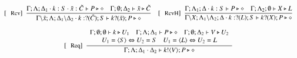 \begin{figure}[!t]
\[\begin{array}{c}
		\trule{Rcv}~~\tree{
			\Gamma; \Lambda; \Delta_1 \cat k: S \cat \tilde{x}: \tilde{C} \proves P \hastype \Proc
			\quad
			\Gamma; \es; \Delta_2 \proves \tilde{x} \hastype \tilde{C}
		}{
			\Gamma \backslash \tilde{x}; \Lambda; \Delta_1 \backslash \Delta_2 \cat k: \btinp{\tilde{C}} S \vdash \binp{k}{\tilde{x}} P \hastype \Proc
		}
		\quad
		\trule{RcvH}~~\tree{
			\Gamma; \Lambda_1; \Delta \cat k: S \proves P \hastype \Proc
			\quad
			\Gamma; \Lambda_2; \es \proves X \hastype L
		}{
			\Gamma \backslash X; \Lambda_1 \backslash \Lambda_2; \Delta \cat k: \btinp{L} S \proves \binp{k}{X} P \hastype \Proc
		}
		\\[6mm]


		\trule{Req}~~\tree{
			\begin{array}{c}
				\Gamma; \es; \es \proves k \hastype U_1
				\quad
				\Gamma; \Lambda; \Delta_1 \proves P \hastype \Proc
				\quad
				\Gamma; \es; \Delta_2 \proves V \hastype U_2
				\\
				U_1 = \chtype{S} \Leftrightarrow U_2 = S
				\quad
				U_1 = \chtype{L} \Leftrightarrow U_2 = L
			\end{array}
		}{
			\Gamma; \Lambda; \Delta_1 \cat \Delta_2 \proves \bout{k}{V} P \hastype \Proc
		}
		\\[6mm]



\end{array}\]
\end{figure}
